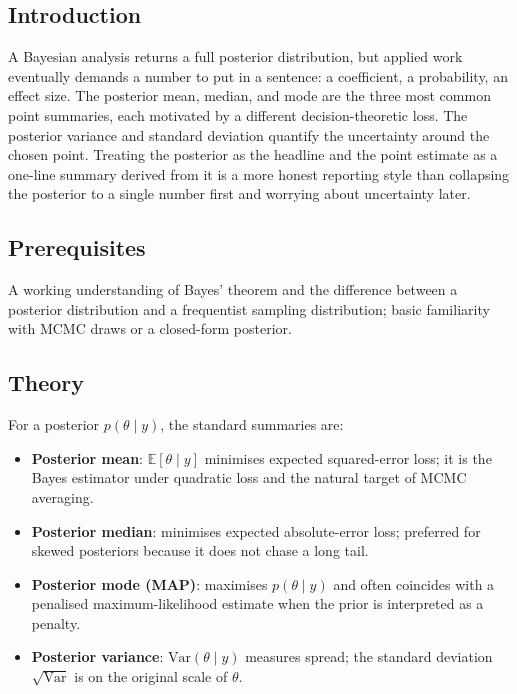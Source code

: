 \documentclass[
]{article}
\author{}
\date{\vspace{-2.5em}}
\providecommand{\tightlist}{%
  \setlength{\itemsep}{0pt}\setlength{\parskip}{0pt}}
\begin{document}
\subsection{Introduction}\label{introduction}

A Bayesian analysis returns a full posterior distribution, but applied
work eventually demands a number to put in a sentence: a coefficient, a
probability, an effect size. The posterior mean, median, and mode are
the three most common point summaries, each motivated by a different
decision-theoretic loss. The posterior variance and standard deviation
quantify the uncertainty around the chosen point. Treating the posterior
as the headline and the point estimate as a one-line summary derived
from it is a more honest reporting style than collapsing the posterior
to a single number first and worrying about uncertainty later.

\subsection{Prerequisites}\label{prerequisites}

A working understanding of Bayes' theorem and the difference between a
posterior distribution and a frequentist sampling distribution; basic
familiarity with MCMC draws or a closed-form posterior.

\subsection{Theory}\label{theory}

For a posterior \(p(\theta \mid y)\), the standard summaries are:

\begin{itemize}
\tightlist
\item
  \textbf{Posterior mean}: \(\mathbb E[\theta \mid y]\) minimises
  expected squared-error loss; it is the Bayes estimator under quadratic
  loss and the natural target of MCMC averaging.
\item
  \textbf{Posterior median}: minimises expected absolute-error loss;
  preferred for skewed posteriors because it does not chase a long tail.
\item
  \textbf{Posterior mode (MAP)}: maximises \(p(\theta \mid y)\) and
  often coincides with a penalised maximum-likelihood estimate when the
  prior is interpreted as a penalty.
\item
  \textbf{Posterior variance}: \(\mathrm{Var}(\theta \mid y)\) measures
  spread; the standard deviation \(\sqrt{\mathrm{Var}}\) is on the
  original scale of \(\theta\).
\end{itemize}
\end{document}
